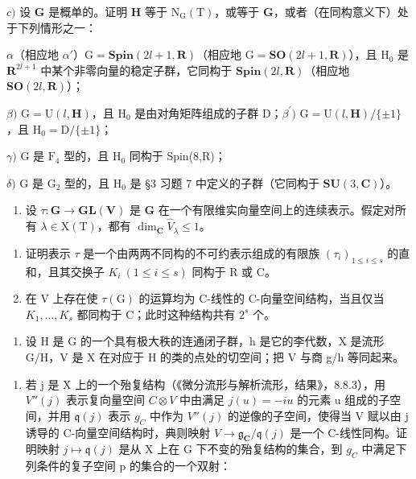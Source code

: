 \(c)\) 设 \(\mathbf{G}\) 是概单的。证明 \(\mathbf{H}\) 等于 \(\mathrm{N_G(T)}\)，或等于 \(\mathbf{G}\)，或者（在同构意义下）处于下列情形之一：

\(\alpha\)（相应地 \(\alpha'\)）\(\mathrm{G} = \mathbf{Spin}(2l + 1, \mathbf{R})\)（相应地 \(\mathrm{G} = \mathbf{SO}(2l + 1, \mathbf{R})\)），且 \(\mathrm{H}_0\) 是 \(\mathbf{R}^{2l + 1}\) 中某个非零向量的稳定子群，它同构于 \(\mathbf{Spin}(2l, \mathbf{R})\)（相应地 \(\mathbf{SO}(2l, \mathbf{R})\)）；

\(\beta)\) \(\mathrm{G} = \mathrm{U}(l,\mathbf{H})\)，且 \(\mathrm{H}_0\) 是由对角矩阵组成的子群 D；\(\beta^{\prime})\) \(\mathrm{G} = \mathrm{U}(l,\mathbf{H}) / \{\pm 1\}\)，且 \(\mathrm{H}_0 = \mathrm{D} / \{\pm 1\}\)；

\(\gamma)\) G 是 \(\mathrm{F}_4\) 型的，且 \(\mathrm{H}_0\) 同构于 Spin(8,R)；

\(\delta)\) G 是 \(\mathrm{G}_2\) 型的，且 \(\mathrm{H}_0\) 是 §3 习题 7 中定义的子群（它同构于 \(\mathbf{SU}(3,\mathbf{C})\)）。

\begin{enumerate}
\def\labelenumi{\arabic{enumi})}
\setcounter{enumi}{6}
\tightlist
\item
  设 \(\tau : \mathbf{G} \to \mathbf{GL}(\mathbf{V})\) 是 \(\mathbf{G}\) 在一个有限维实向量空间上的连续表示。假定对所有 \(\lambda \in \mathrm{X}(\mathrm{T})\)，都有 \(\dim_{\mathbf{C}} \hat{V}_{\lambda} \leq 1\)。
\end{enumerate}

\begin{enumerate}
\def\labelenumi{\alph{enumi})}
\item
  证明表示 \(\tau\) 是一个由两两不同构的不可约表示组成的有限族 \((\tau_{i})_{1\leq i\leq s}\) 的直和，且其交换子 \(K_{i}\ (1\leq i\leq s)\) 同构于 R 或 C。
\item
  在 V 上存在使 \(\tau(\mathrm{G})\) 的运算均为 C-线性的 C-向量空间结构，当且仅当 \(K_{1},\ldots,K_{s}\) 都同构于 C；此时这种结构共有 \(2^{s}\) 个。
\end{enumerate}

\begin{enumerate}
\def\labelenumi{\arabic{enumi})}
\setcounter{enumi}{7}
\tightlist
\item
  设 H 是 G 的一个具有极大秩的连通闭子群，h 是它的李代数，X 是流形 G/H，V 是 X 在对应于 H 的类的点处的切空间；把 V 与商 g/h 等同起来。
\end{enumerate}

\begin{enumerate}
\def\labelenumi{\alph{enumi})}
\tightlist
\item
  若 j 是 X 上的一个殆复结构（《微分流形与解析流形，结果》，8.8.3），用 \(V''(j)\) 表示复向量空间 \(C \otimes V\) 中由满足 \(j(u) = -iu\) 的元素 u 组成的子空间，并用 \(\mathfrak{q}(j)\) 表示 \(g_{C}\) 中作为 \(V''(j)\) 的逆像的子空间，使得当 V 赋以由 j 诱导的 C-向量空间结构时，典则映射 \(V \to \mathfrak{g}_{\mathbf{C}} / \mathfrak{q}(j)\) 是一个 C-线性同构。证明映射 \(j \mapsto \mathfrak{q}(j)\) 是从 X 上在 G 下不变的殆复结构的集合，到 \(g_{C}\) 中满足下列条件的复子空间 p 的集合的一个双射：
\end{enumerate}

